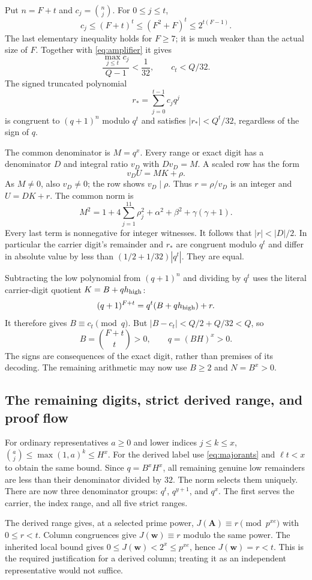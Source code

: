 \documentclass[11pt]{article}
\theoremstyle{definition}
\begin{document}
Put $n=F+t$ and $c_j=\binom nj$. For $0\le j\le t$,
\[
c_j\le(F+t)^t\le(F^2+F)^t\le2^{t(F-1)}.
\]
The last elementary inequality holds for $F\ge7$; it is much weaker
than the actual size of $F$. Together with \eqref{eq:amplifier} it gives
\[
\frac{\max_{j\le t}c_j}{Q-1}<\frac1{32},\qquad c_t<Q/32.
\]
The signed truncated polynomial
\[
r_* = \sum_{j=0}^{t-1}c_jq^j
\]
is congruent to $(q+1)^n$ modulo $q^t$ and satisfies
$|r_*|<Q^t/32$, regardless of the sign of $q$.

The common denominator is $M=q^x$. Every range or exact digit has a
denominator $D$ and integral ratio $v_D$ with $Dv_D=M$. A scaled row
has the form
\[
v_DU=MK+\rho.
\]
As $M\ne0$, also $v_D\ne0$; the row shows $v_D\mid\rho$.
Thus $r=\rho/v_D$ is an integer and $U=DK+r$. The common norm is
\begin{equation}\label{eq:norm}
M^2=1+4\sum_{j=1}^{11}\rho_j^2+\alpha^2+\beta^2+\gamma(\gamma+1).
\end{equation}
Every last term is nonnegative for integer witnesses. It follows that
$|r|<|D|/2$. In particular the carrier digit's remainder and $r_*$
are congruent modulo $q^t$ and differ in absolute value by less than
$(1/2+1/32)|q^t|$. They are equal.

Subtracting the low polynomial from $(q+1)^n$ and dividing by $q^t$
uses the literal carrier-digit quotient $K=B+q h_{\rm high}$:
\[
(q+1)^{F+t}=q^t(B+q h_{\rm high})+r.
\]
It therefore gives $B\equiv c_t\pmod q$. But
$|B-c_t|<Q/2+Q/32<Q$, so
\[
B=\binom{F+t}{t}>0,\qquad q=(BH)^x>0.
\]
The signs are consequences of the exact digit, rather than premises
of its decoding. The remaining arithmetic may now use $B\ge2$ and
$N=B^x>0$.

\subsection{The remaining digits, strict derived range, and proof flow}

For ordinary representatives $a\ge0$ and lower indices $j\le k\le x$,
$\binom aj\le\max(1,a)^k\le H^x$. For the derived label use
\eqref{eq:majorants} and $\ell t<x$ to obtain the same bound.
Since $q=B^xH^x$, all remaining genuine low remainders are less than
their denominator divided by $32$. The norm selects them uniquely.
There are now three denominator groups: $q^t$, $q^{y+1}$, and $q^x$.
The first serves the carrier, the index range, and all five strict ranges.

The derived range gives, at a selected prime power,
$J(\boldsymbol A)\equiv r\pmod{p^{xe}}$ with $0\le r<t$.
Column congruences give $J(\boldsymbol w)\equiv r$ modulo the same
power. The inherited local bound gives
$0\le J(\boldsymbol w)<2^x\le p^{xe}$, hence
$J(\boldsymbol w)=r<t$. This is the required justification for a
derived column; treating it as an independent representative would
not suffice.
\end{document}
